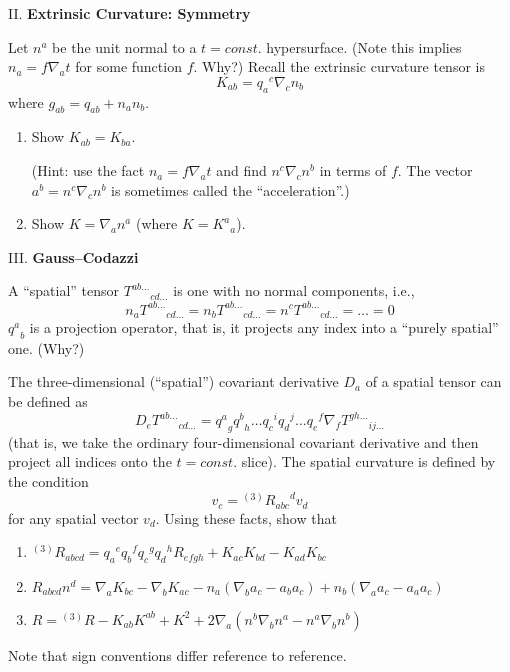 \bigbreak\noindent{}II. \textbf{Extrinsic Curvature: Symmetry}\bigbreak

Let $n^{a}$ be the unit normal to a $t=const.$ hypersurface. (Note this
implies $n_{a}=f\nabla_{a}t$ for some function $f$. Why?) Recall the
extrinsic curvature tensor is
\begin{equation}
K_{ab} = {q_{a}}^{c}\nabla_{c}n_{b}
\end{equation}
where $g_{ab}=q_{ab}+n_{a}n_{b}$.

\begin{enumerate}[label=(\alph*),nosep]
\item Show $K_{ab}=K_{ba}$.

  (Hint: use the fact $n_{a}=f\nabla_{a}t$ and find
  $n^{c}\nabla_{c}n^{b}$ in terms of $f$. The vector
  $a^{b}=n^{c}\nabla_{c}n^{b}$ is sometimes called the ``acceleration''.)
\item Show $K=\nabla_{a}n^{a}$ (where $K={K^{a}}_{a}$).
\end{enumerate}

\bigbreak\noindent{}III. \textbf{Gauss--Codazzi}\bigbreak

A ``spatial'' tensor ${T^{ab\dots}}_{cd\dots}$ is one with no normal
components, i.e.,
\begin{equation*}
n_{a}{T^{ab\dots}}_{cd\dots} = n_{b}{T^{ab\dots}}_{cd\dots} =
n^{c}{T^{ab\dots}}_{cd\dots} = \dots = 0
\end{equation*}
${q^{a}}_{b}$ is a projection operator, that is, it projects any index
into a ``purely spatial'' one. (Why?)

The three-dimensional (``spatial'') covariant derivative $D_{a}$ of a
spatial tensor can be defined as
\begin{equation*}
D_{e}{T^{ab\dots}}_{cd\dots} = {q^{a}}_{g}{q^{b}}_{h}\dots{q_{c}}^{i}{q_{d}}^{j}\dots{q_{e}}^{f}\nabla_{f}{T^{gh\dots}}_{ij\dots}
\end{equation*}
(that is, we take the ordinary four-dimensional covariant derivative and
then project all indices onto the $t=const.$ slice). The spatial
curvature is defined by the condition
\begin{equation*}
[D_{a},D_{b}]v_{c}={}^{(3)}\!{R_{abc}}^{d}v_{d}
\end{equation*}
for any spatial vector $v_{d}$. Using these facts, show that
\begin{enumerate}[label=(\alph*),nosep]
\item ${}^{(3)}\!{R_{abcd}} = {q_{a}}^{e}{q_{b}}^{f}{q_{c}}^{g}{q_{d}}^{h}R_{efgh}+K_{ac}K_{bd}-K_{ad}K_{bc}$
\item $R_{abcd}n^{d}=\nabla_{a}K_{bc} - \nabla_{b}K_{ac} - n_{a}(\nabla_{b}a_{c}-a_{b}a_{c}) + n_{b}(\nabla_{a}a_{c}-a_{a}a_{c})$
\item $R = {}^{(3)}\!R - K_{ab}K^{ab} + K^{2} + 2\nabla_{a}(n^{b}\nabla_{b}n^{a} - n^{a}\nabla_{b}n^{b})$
\end{enumerate}
Note that sign conventions differ reference to reference.

